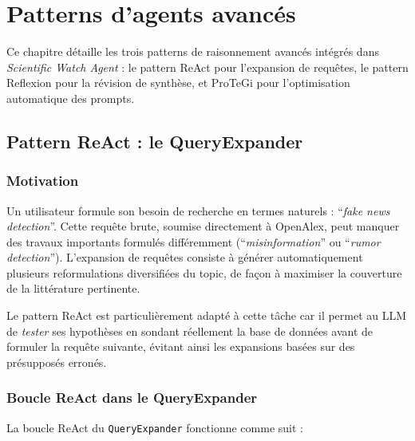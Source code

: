 \chapter{Patterns d'agents avancés}
\label{ch:patterns}

Ce chapitre détaille les trois patterns de raisonnement avancés intégrés
dans \textit{Scientific Watch Agent} : le pattern ReAct pour l'expansion
de requêtes, le pattern Reflexion pour la révision de synthèse, et
ProTeGi pour l'optimisation automatique des prompts.

\section{Pattern ReAct : le QueryExpander}
\label{sec:react}

\subsection{Motivation}

Un utilisateur formule son besoin de recherche en termes naturels :
``\textit{fake news detection}''. Cette requête brute, soumise directement
à OpenAlex, peut manquer des travaux importants formulés différemment
(``\textit{misinformation}'' ou ``\textit{rumor detection}'').
L'expansion de requêtes consiste à générer automatiquement plusieurs
reformulations diversifiées du topic, de façon à maximiser la couverture
de la littérature pertinente.

Le pattern ReAct \cite{yao2022react} est particulièrement adapté à cette
tâche car il permet au LLM de \textit{tester} ses hypothèses en sondant
réellement la base de données avant de formuler la requête suivante,
évitant ainsi les expansions basées sur des présupposés erronés.

\subsection{Boucle ReAct dans le QueryExpander}

La boucle ReAct du \texttt{QueryExpander} fonctionne comme suit :

